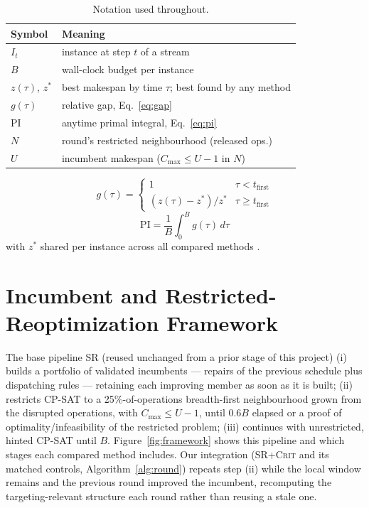 \documentclass[letterpaper]{article} %
\newcommand{\base}{\textsc{SR}}
\newcommand{\crit}{\textsc{SR+Crit}}
\begin{document}
\begin{table}[t]
\centering\small
\setlength{\tabcolsep}{4pt}
\begin{tabular}{ll}
\toprule
Symbol & Meaning \\
\midrule
$I_t$ & instance at step $t$ of a stream \\
$B$ & wall-clock budget per instance \\
$z(\tau)$, $z^*$ & best makespan by time $\tau$; best found by any method \\
$g(\tau)$ & relative gap, Eq.~\ref{eq:gap} \\
$\mathrm{PI}$ & anytime primal integral, Eq.~\ref{eq:pi} \\
$N$ & round's restricted neighbourhood (released ops.) \\
$U$ & incumbent makespan ($C_{\max}\le U{-}1$ in $N$) \\
\bottomrule
\end{tabular}
\caption{Notation used throughout.}
\label{tab:notation}
\end{table}

\begin{equation}
g(\tau) = \begin{cases} 1 & \tau < t_{\mathrm{first}} \\ (z(\tau)-z^*)/z^* & \tau \ge t_{\mathrm{first}} \end{cases}
\label{eq:gap}
\end{equation}
\begin{equation}
\mathrm{PI} = \frac{1}{B}\int_0^B g(\tau)\,d\tau
\label{eq:pi}
\end{equation}
with $z^*$ shared per instance across all compared methods \citep{berthold2013}.

\section{Incumbent and Restricted-Reoptimization Framework}
\label{sec:method}

The base pipeline \base{} (reused unchanged from a prior stage of this project) (i) builds a portfolio of validated incumbents --- repairs of the previous schedule plus dispatching rules --- retaining each improving member as soon as it is built; (ii) restricts CP-SAT to a 25\%-of-operations breadth-first neighbourhood grown from the disrupted operations, with $C_{\max}\le U-1$, until $0.6B$ elapsed or a proof of optimality/infeasibility of the restricted problem; (iii) continues with unrestricted, hinted CP-SAT until $B$. Figure~\ref{fig:framework} shows this pipeline and which stages each compared method includes. Our integration (\crit{} and its matched controls, Algorithm~\ref{alg:round}) repeats step (ii) while the local window remains and the previous round improved the incumbent, recomputing the targeting-relevant structure each round rather than reusing a stale one.
\end{document}
